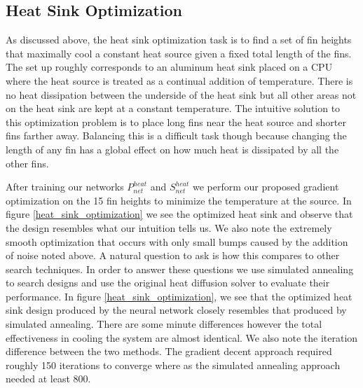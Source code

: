 \documentclass{article} %
\begin{document}
\subsection{Heat Sink Optimization}

As discussed above, the heat sink optimization task is to find a set of fin heights that maximally cool a constant heat source given a fixed total length of the fins. The set up roughly corresponds to an aluminum heat sink placed on a CPU where the heat source is treated as a continual addition of temperature. There is no heat dissipation between the underside of the heat sink but all other areas not on the heat sink are kept at a constant temperature. The intuitive solution to this optimization problem is to place long fins near the heat source and shorter fins farther away. Balancing this is a difficult task though because changing the length of any fin has a global effect on how much heat is dissipated by all the other fins. 

After training our networks $P^{heat}_{net}$ and $S^{heat}_{net}$ we perform our proposed gradient optimization on the 15 fin heights to minimize the temperature at the source. In figure \ref{heat_sink_optimization} we see the optimized heat sink and observe that the design resembles what our intuition tells us. We also note the extremely smooth optimization that occurs with only small bumps caused by the addition of noise noted above. A natural question to ask is how this compares to other search techniques. In order to answer these questions we use simulated annealing to search designs and use the original heat diffusion solver to evaluate their performance. In figure \ref{heat_sink_optimization}, we see that the optimized heat sink design produced by the neural network closely resembles that produced by simulated annealing. There are some minute differences however the total effectiveness in cooling the system are almost identical. We also note the iteration difference between the two methods. The gradient decent approach required roughly 150 iterations to converge where as the simulated annealing approach needed at least 800.
\end{document}

